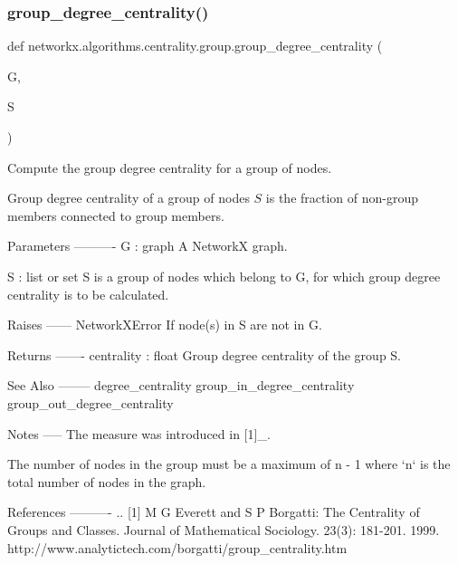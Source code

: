  \mbox{\label{namespacenetworkx_1_1algorithms_1_1centrality_1_1group_adced651bd943e084ef9016af4ccce328}} 
\subsubsection{\texorpdfstring{group\+\_\+degree\+\_\+centrality()}{group\_degree\_centrality()}}
{\footnotesize\ttfamily def networkx.\+algorithms.\+centrality.\+group.\+group\+\_\+degree\+\_\+centrality (\begin{DoxyParamCaption}\item[{}]{G,  }\item[{}]{S }\end{DoxyParamCaption})}

\begin{DoxyVerb}Compute the group degree centrality for a group of nodes.

Group degree centrality of a group of nodes $S$ is the fraction
of non-group members connected to group members.

Parameters
----------
G : graph
   A NetworkX graph.

S : list or set
   S is a group of nodes which belong to G, for which group degree
   centrality is to be calculated.

Raises
------
NetworkXError
   If node(s) in S are not in G.

Returns
-------
centrality : float
   Group degree centrality of the group S.

See Also
--------
degree_centrality
group_in_degree_centrality
group_out_degree_centrality

Notes
-----
The measure was introduced in [1]_.

The number of nodes in the group must be a maximum of n - 1 where `n`
is the total number of nodes in the graph.

References
----------
.. [1] M G Everett and S P Borgatti:
   The Centrality of Groups and Classes.
   Journal of Mathematical Sociology. 23(3): 181-201. 1999.
   http://www.analytictech.com/borgatti/group_centrality.htm
\end{DoxyVerb}
 \mbox{\label{namespacenetworkx_1_1algorithms_1_1centrality_1_1group_af4a95d706740e3f3c214671da94be2d5}} 

